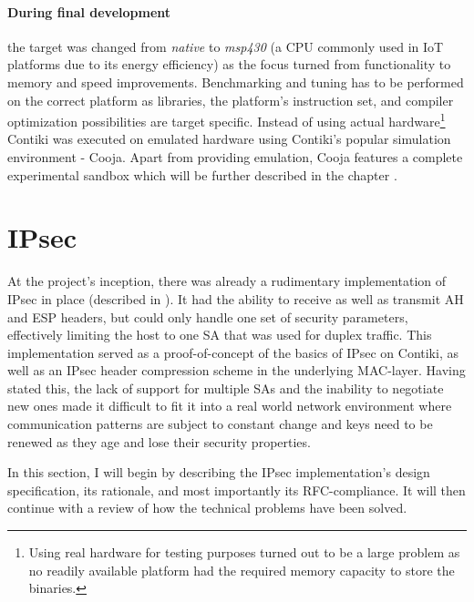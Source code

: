 \documentclass[final,a4paper,twoside,11pt,onecolumn]{report}
\begin{document}
\paragraph{During final development} \label{sec:finaldev} the target was changed from \emph{native} to \emph{msp430} (a CPU commonly used in IoT platforms due to its energy efficiency) as the focus turned from functionality to memory and speed improvements. Benchmarking and tuning has to be performed on the correct platform as libraries, the platform's instruction set, and compiler optimization possibilities are target specific. Instead of using actual hardware\footnote{Using real hardware for testing purposes turned out to be a large problem as no readily available platform had the required memory capacity to store the binaries.} Contiki was executed on emulated hardware using Contiki's popular simulation environment - Cooja\cite{osterlind06crosslevel}. Apart from providing emulation, Cooja features a complete experimental sandbox which will be further described in the chapter .



\section{IPsec}
At the project's inception, there was already a rudimentary implementation of IPsec in place (described in \cite{raza12secure}). It had the ability to receive as well as transmit AH and ESP headers, but could only handle one set of security parameters, effectively limiting the host to one SA that was used for duplex traffic. This implementation served as a proof-of-concept of the basics of IPsec on Contiki, as well as an IPsec header compression scheme in the underlying MAC-layer. Having stated this, the lack of support for multiple SAs and the inability to negotiate new ones made it difficult to fit it into a real world network environment where communication patterns are subject to constant change and keys need to be renewed as they age and lose their security properties.

In this section, I will begin by describing the IPsec implementation's design specification, its rationale, and most importantly its RFC-compliance. It will then continue with a review of how the technical problems have been solved.
\end{document}
